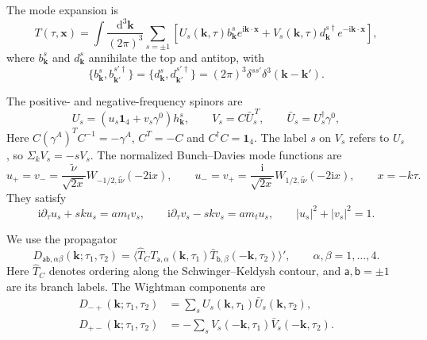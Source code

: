 \documentclass[a4paper,12pt]{article}
\def\di{{\mathrm{d}}}
\def\mb{\mathbf}
\def\ii{\mathrm{i}}
\def\tn{\tilde\nu}
\def\aa{\mathsf{a}}
\def\bb{\mathsf{b}}
\begin{document}
The mode expansion is
\begin{equation}
 T(\tau,\mb x)=\int\frac{\di^3\mb k}{(2\pi)^3}\sum_{s=\pm1}
 \left[U_s(\mb k,\tau)b^s_{\mb k}e^{\ii\mb k\cdot\mb x}
       +V_s(\mb k,\tau)d^{s\dagger}_{\mb k}e^{-\ii\mb k\cdot\mb x}\right],
 \label{eq:dirac-mode-expansion}
\end{equation}
where $b^s_{\mb k}$ and $d^s_{\mb k}$ annihilate the top and antitop, with
\begin{equation}
 \{b^s_{\mb k},b^{s'\dagger}_{\mb k'}\}
 =\{d^s_{\mb k},d^{s'\dagger}_{\mb k'}\}
 =(2\pi)^3\delta^{ss'}\delta^3(\mb k-\mb k').
 \label{eq:dirac-anticommutators}
\end{equation}

The positive- and negative-frequency spinors are
\begin{equation}
 U_s=(u_s\mathbf1_4+v_s\gamma^0)h^s_{\mb k},\qquad
 V_s=C\bar U_s^{\,T},\qquad \bar U_s=U_s^\dagger\gamma^0,
 \label{eq:dirac-mode-spinors}
\end{equation}
Here $C(\gamma^A)^TC^{-1}=-\gamma^A$, $C^T=-C$ and $C^\dagger C=\mathbf1_4$.
The label $s$ on $V_s$ refers to $U_s$, so $\Sigma_kV_s=-sV_s$.
The normalized Bunch--Davies mode functions are
\begin{equation}
 u_+=v_- =\frac{\tn}{\sqrt{2x}}
 W_{-1/2,\ii\tn}(-2\ii x),\qquad
 u_-=v_+ =\frac{\ii}{\sqrt{2x}}
 W_{1/2,\ii\tn}(-2\ii x),\qquad x=-k\tau.
 \label{eq:dirac-radial-modes}
\end{equation}
They satisfy
\begin{equation}
 \ii\partial_\tau u_s+sku_s=am_tv_s,\qquad
 \ii\partial_\tau v_s-skv_s=am_tu_s,\qquad
 |u_s|^2+|v_s|^2=1.
 \label{eq:dirac-radial-eom}
\end{equation}

We use the propagator
\begin{equation}
 D_{\aa\bb,\alpha\beta}(\mb k;\tau_1,\tau_2)
 =\langle \hat{T}_C T_{\aa,\alpha}(\mb k,\tau_1)
                 \bar T_{\bb,\beta}(-\mb k,\tau_2)\rangle',
 \qquad \alpha,\beta=1,\ldots,4.
 \label{eq:dirac-propagator-definition}
\end{equation}
Here $\hat T_C$ denotes ordering along the Schwinger--Keldysh contour, and $\aa,\bb=\pm1$ are its branch labels.
The Wightman components are
\begin{align}
 D_{-+}(\mb k;\tau_1,\tau_2)
 &=\sum_s U_s(\mb k,\tau_1)\bar U_s(\mb k,\tau_2),\nonumber\\
 D_{+-}(\mb k;\tau_1,\tau_2)
 &=-\sum_s V_s(-\mb k,\tau_1)\bar V_s(-\mb k,\tau_2).
 \label{eq:dirac-wightman}
\end{align}
\end{document}
